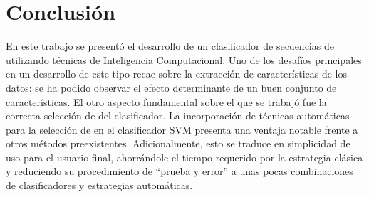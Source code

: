 %
%
%
%
\chapter{Conclusión}
%
En este trabajo se presentó el desarrollo de un clasificador de
secuencias de  utilizando técnicas de Inteligencia
Computacional.
Uno de los desafíos principales en un desarrollo de este tipo recae
sobre la extracción de características de los datos: se ha podido
observar el efecto determinante de un buen conjunto de
características.
El otro aspecto fundamental sobre el que se trabajó fue la correcta
selección de  del clasificador.
La incorporación de técnicas automáticas para la selección de
 en el clasificador SVM presenta una ventaja notable frente
a otros métodos preexistentes.
Adicionalmente, esto se traduce en simplicidad de uso para el usuario
final, ahorrándole el tiempo requerido por la estrategia clásica y
reduciendo su procedimiento de ``prueba y error'' a unas pocas
combinaciones de clasificadores y estrategias automáticas.
